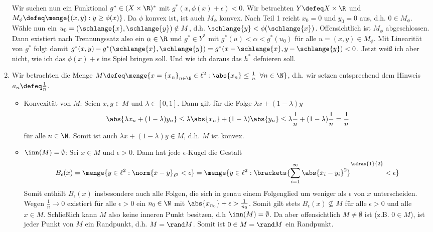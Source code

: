 \begin{exercisePage}
\begin{enumerate}[label=(zu \alph*), leftmargin=*]
		Wir suchen nun ein Funktional $g^\ast \in (X \times \R)^\ast$ mit $g^\ast(x,\phi(x) + \epsilon) < 0$. 
		Wir betrachten $Y \defeq X \times \R$ und $M_\phi \defeq \menge{(x,y) : y \ge \phi(x)}$. Da $\phi$ konvex ist, ist auch $M_\phi$ konvex. Nach Teil 1 reicht $x_0 = 0$ und $y_0 = 0$ aus, d.h. $0 \in M_\phi$. Wähle nun ein $u_0 = (\schlange{x},\schlange{y}) \notin M$, d.h. $\schlange{y} < \phi(\schlange{x})$. Offensichtlich ist $M_\phi$ abgeschlossen. Dann existiert nach Trennungssatz also ein $\alpha \in \R$ und $g^\ast \in Y^\ast$ mit $g^\ast(u) < \alpha < g^\ast(u_0)$ für alle $u=(x,y) \in M_\phi$. Mit Linearität von $g^\ast$ folgt damit $g^\ast(x,y) - g^\ast(\schlange{x},\schlange{y}) = g^\ast(x-\schlange{x},y-\schlange{y}) < 0$.
		\textcolor{cdpurple}{Jetzt weiß ich aber nicht, wie ich das $\phi(x) + \epsilon$ ins Spiel bringen soll. Und wie ich daraus das $h^\ast$ defnieren soll.}
		\item Wir betrachten die Menge $M \defeq \menge{x = \folge{x_n}{n \in \N} \in \ell^2 : \abs{x_n} \le \frac{1}{n} \enskip \forall n \in \N}$, d.h. wir setzen entsprechend dem Hinweis $a_n \defeq \frac{1}{n}$.
		\begin{itemize}[leftmargin=*]
			\item Konvexität von $M$: Seien $x,y \in M$ und $\lambda \in [0,1]$. Dann gilt für die Folge $\lambda x + (1-\lambda) y$
			\begin{equation*}
				\abs{\lambda x_n + (1-\lambda) y_n} \le \lambda \abs{x_n} + (1-\lambda) \abs{y_n} \le \lambda \frac{1}{n} + (1-\lambda) \frac{1}{n} = \frac{1}{n}
			\end{equation*}
			für alle $n \in \N$. Somit ist auch $\lambda x + (1-\lambda) y \in M$, d.h. $M$ ist konvex.
			\item $\inn(M) = \emptyset$: Sei $x \in M$ und $\epsilon > 0$. Dann hat jede $\epsilon$-Kugel die Gestalt
			\begin{equation*}
				B_\epsilon(x) = \menge{y \in \ell^2: \norm{x-y}_{\ell^2} < \epsilon} = \menge{y \in \ell^2 : \brackets{\sum_{i=1}^\infty \abs{x_i - y_i}^2}^{\sfrac{1}{2}} < \epsilon}
			\end{equation*}
			Somit enthält $B_\epsilon(x)$ insbesondere auch alle Folgen, die sich in genau einem Folgenglied um weniger als $\epsilon$ von $x$ unterscheiden. Wegen $\frac{1}{n} \to 0$ existiert für alle $\epsilon > 0$ ein $n_0 \in \N$ mit $\abs{x_{n_0}} + \epsilon > \frac{1}{n_0}$. Somit gilt stets $B_\epsilon(x) \nsubseteq M$ für alle $\epsilon > 0$ und alle $x \in M$. Schließlich kann $M$ also keine inneren Punkt besitzen, d.h $\inn(M) = \emptyset$. Da aber offensichtlich $M \neq \emptyset$ ist (z.B. $0 \in M$), ist jeder Punkt von $M$ ein Randpunkt, d.h. $M = \rand M$. Somit ist $0 \in M = \rand M$ ein Randpunkt.

\end{itemize}
\end{enumerate}
\end{exercisePage}

